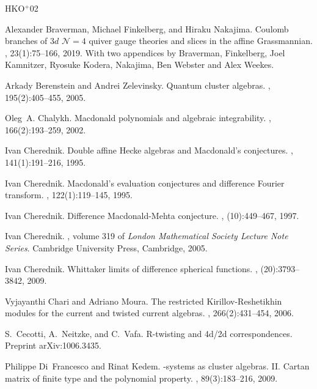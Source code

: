 \documentclass[12pt]{amsart}
\numberwithin{equation}{section}
\begin{document}
\newcommand{\etalchar}[1]{$^{#1}$}
\def\cprime{$'$}
\begin{thebibliography}{HKO{\etalchar{+}}02}

Alexander Braverman, Michael Finkelberg, and Hiraku Nakajima.
\newblock Coulomb branches of {$3d$} {$\mathcal N=4$} quiver gauge theories and
  slices in the affine {G}rassmannian.
, 23(1):75--166, 2019.
\newblock With two appendices by Braverman, Finkelberg, Joel Kamnitzer, Ryosuke
  Kodera, Nakajima, Ben Webster and Alex Weekes.

Arkady Berenstein and Andrei Zelevinsky.
\newblock Quantum cluster algebras.
, 195(2):405--455, 2005.

Oleg~A. Chalykh.
\newblock Macdonald polynomials and algebraic integrability.
, 166(2):193--259, 2002.

Ivan Cherednik.
\newblock Double affine {H}ecke algebras and {M}acdonald's conjectures.
, 141(1):191--216, 1995.

Ivan Cherednik.
\newblock Macdonald's evaluation conjectures and difference {F}ourier
  transform.
, 122(1):119--145, 1995.

Ivan Cherednik.
\newblock Difference {M}acdonald-{M}ehta conjecture.
, (10):449--467, 1997.

Ivan Cherednik.
, volume 319 of {\em London
  Mathematical Society Lecture Note Series}.
\newblock Cambridge University Press, Cambridge, 2005.

Ivan Cherednik.
\newblock Whittaker limits of difference spherical functions.
, (20):3793--3842, 2009.

Vyjayanthi Chari and Adriano Moura.
\newblock The restricted {K}irillov-{R}eshetikhin modules for the current and
  twisted current algebras.
, 266(2):431--454, 2006.

S.~Cecotti, A.~Neitzke, and C.~Vafa.
\newblock R-twisting and 4d/2d correspondences.
\newblock Preprint arXiv:1006.3435.

Philippe Di~Francesco and Rinat Kedem.
-systems as cluster algebras. {II}. {C}artan matrix of finite
  type and the polynomial property.
, 89(3):183--216, 2009.


\end{thebibliography}
\end{document}
